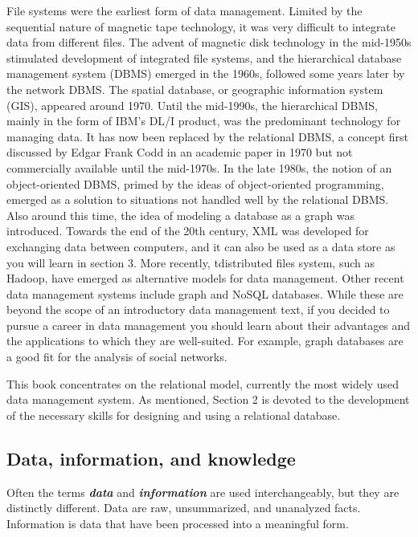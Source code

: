 \documentclass[
]{article}
\begin{document}
File systems were the earliest form of data management. Limited by the
sequential nature of magnetic tape technology, it was very difficult to
integrate data from different files. The advent of magnetic disk
technology in the mid-1950s stimulated development of integrated file
systems, and the hierarchical database management system (DBMS) emerged
in the 1960s, followed some years later by the network DBMS. The spatial
database, or geographic information system (GIS), appeared around 1970.
Until the mid-1990s, the hierarchical DBMS, mainly in the form of IBM's
DL/I product, was the predominant technology for managing data. It has
now been replaced by the relational DBMS, a concept first discussed by
Edgar Frank Codd in an academic paper in 1970 but not commercially
available until the mid-1970s. In the late 1980s, the notion of an
object-oriented DBMS, primed by the ideas of object-oriented
programming, emerged as a solution to situations not handled well by the
relational DBMS. Also around this time, the idea of modeling a database
as a graph was introduced. Towards the end of the 20th century, XML was
developed for exchanging data between computers, and it can also be used
as a data store as you will learn in section 3. More recently,
tdistributed files system, such as Hadoop, have emerged as alternative
models for data management. Other recent data management systems include
graph and NoSQL databases. While these are beyond the scope of an
introductory data management text, if you decided to pursue a career in
data management you should learn about their advantages and the
applications to which they are well-suited. For example, graph databases
are a good fit for the analysis of social networks.

This book concentrates on the relational model, currently the most
widely used data management system. As mentioned, Section 2 is devoted
to the development of the necessary skills for designing and using a
relational database.

\hypertarget{data-information-and-knowledge}{%
\subsection*{Data, information, and knowledge}\label{data-information-and-knowledge}}

Often the terms \textbf{\emph{data}} and \textbf{\emph{information}} are used
interchangeably, but they are distinctly different. Data are raw,
unsummarized, and unanalyzed facts. Information is data that have been
processed into a meaningful form.
\end{document}
